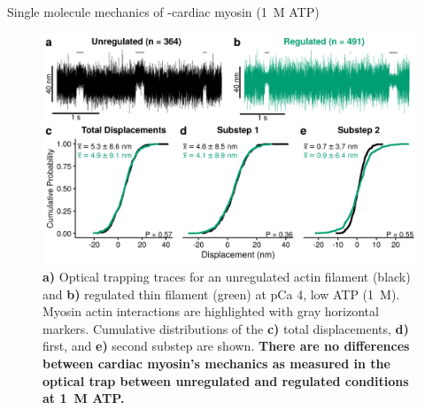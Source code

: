 \documentclass[final]{beamer}
\newlength{\colwidth}
\begin{document}
\begin{frame}[t]
\begin{columns}[t]
\begin{column}{\colwidth}
    \begin{block}{\large{Single molecule mechanics of {\textbeta}-cardiac myosin (1~{\textmu}M ATP)    }}
      \begin{figure}
         \includegraphics[scale=1.8]{step-size}
         \caption{\textbf{a)} Optical trapping traces for an unregulated actin filament (black) and \textbf{b)} regulated thin filament (green) at pCa 4, low ATP (1~{\textmu}M). Myosin actin interactions are highlighted with gray horizontal markers. Cumulative distributions of the \textbf{c)} total displacements, \textbf{d)} first, and \textbf{e)} second substep are shown. \textbf{There are no differences between cardiac myosin's mechanics as measured in the optical trap between unregulated and regulated conditions at 1~{\textmu}M ATP.}}

        \end{figure}
  \end{block}


\end{column}
\end{columns}
\end{frame}
\end{document}
